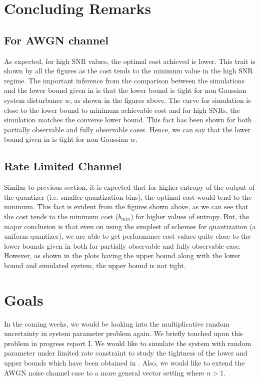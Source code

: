 \documentclass[12pt]{caltech_thesis_progress2}
\begin{document}
\chapter{Concluding Remarks}
\section{For AWGN channel}
As expected, for high SNR values, the optimal cost achieved is lower. This trait is shown by all the figures as the cost tends to the minimum value in the high SNR regime.  The important inference from the comparison between the simulations and the lower bound given in \cite{victoria} is that the lower bound is tight for non Gaussian system disturbance $w$, as shown in the figures above. The curve for simulation is close to the lower bound to minimum achievable cost and for high SNRs, the simulation matches the converse lower bound. This fact has been shown for both partially observable and fully observable cases. Hence, we can say that the lower bound given in \cite{victoria} is tight for non-Gaussian $w$.

\section{Rate Limited Channel}
Similar to previous section, it is expected that for higher entropy of the output of the quantizer (i.e. smaller quantization bins), the optimal cost would tend to the minimum. This fact is evident from the figures shown above, as we can see that the cost tends to the minimum cost ($b_{min}$) for higher values of entropy. But, the major conclusion is that even on using the simplest of schemes for quantization (a uniform quantizer), we are able to get performance cost values quite close to the lower bounds given in \cite{victoria} both for partially observable and fully observable case. However, as shown in the plots having the upper bound along with the lower bound and simulated system, the upper bound is not tight. 

\chapter{Goals}
In the coming weeks, we would be looking into the multiplicative random uncertainty in system parameter problem again. We briefly touched upon this problem in progress report I. We would like to simulate the system with random parameter under limited rate constraint to study the tightness of the lower and upper bounds which have been obtained in \cite{victoria2}. Also, we would like to extend the AWGN noise channel case to a more general vector setting where $n > 1$.
\end{document}
